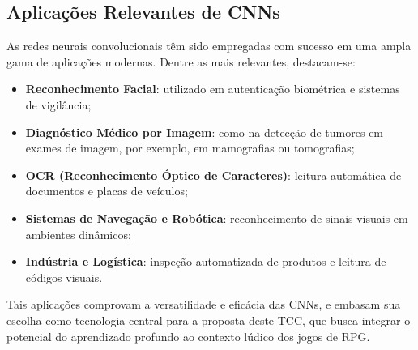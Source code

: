 \subsection{Aplicações Relevantes de CNNs}

As redes neurais convolucionais têm sido empregadas com sucesso
em uma ampla gama de aplicações modernas. Dentre as mais relevantes,
destacam-se:
\begin{itemize}
\item \textbf{Reconhecimento Facial}: utilizado em autenticação
biométrica e sistemas de vigilância;
\item \textbf{Diagnóstico Médico por Imagem}: como na detecção de
tumores em exames de imagem, por exemplo, em mamografias
ou tomografias;
\item \textbf{OCR (Reconhecimento Óptico de Caracteres)}:
leitura automática de documentos e placas de veículos;
\item \textbf{Sistemas de Navegação e Robótica}:
reconhecimento de sinais visuais em ambientes dinâmicos;
\item \textbf{Indústria e Logística}: inspeção automatizada de
produtos e leitura de códigos visuais.
\end{itemize}

Tais aplicações comprovam a versatilidade e eficácia das CNNs,
e embasam sua escolha como tecnologia central para a proposta deste
TCC, que busca integrar o potencial do aprendizado profundo ao
contexto lúdico dos jogos de RPG.
